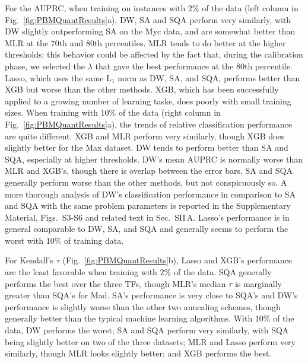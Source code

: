 \documentclass[aps,pra,groupedaddress,nofootinbib,notitlepage,showpacs,floatfix,superscriptaddress]{revtex4-1}
\begin{document}
For the AUPRC, when training on instances with $2\%$ of the data (left column in Fig.~\ref{fig:PBMQuantResults}a), {DW, SA and SQA} perform very similarly, with DW slightly outperforming SA on the Myc data, and are somewhat better than MLR at the $70$th and $80$th percentiles. MLR tends to do better at the higher thresholds: this behavior could be affected by the fact that, during the calibration phase, we selected the $\lambda$ that gave the best performance at the $80$th percentile. {Lasso, which uses the same L$_1$ norm as DW, SA, and SQA, performs better than XGB but worse than the other methods}. XGB, which has been successfully applied to a growing number of learning tasks, does poorly with small training sizes. When training with $10\%$ of the data (right column in Fig.~\ref{fig:PBMQuantResults}a), the trends of relative classification performance are quite different. XGB and MLR perform very similarly, though XGB does slightly better for the Max dataset. {DW tends to perform better than SA and SQA, especially at higher thresholds. DW's mean AUPRC is normally worse than MLR and XGB's, though there is overlap between the error bars.} SA and SQA generally perform worse than the other methods, but not conspicuously so. A more thorough analysis of DW's classification performance in comparison to SA and SQA with the same problem parameters is reported in the Supplementary Material, Figs.~S3-S6 and related text in Sec.~SII\,A. {Lasso's performance is in general comparable to DW, SA, and SQA and generally seems to perform the worst with 10\% of training data.}

{For Kendall's $\tau$ (Fig.~\ref{fig:PBMQuantResults}b), Lasso and XGB's performance are the least favorable when training with $2\%$ of the data. SQA generally performs the best over the three TFs, though MLR's median $\tau$ is marginally greater than SQA's for Mad. SA's performance is very close to SQA's and DW's performance is slightly worse than the other two annealing schemes, though generally better than the typical machine learning algorithms}. With $10\%$ of the data, {DW performs the worst; SA and SQA perform very similarly, with SQA being slightly better on two of the three datasets; MLR and Lasso perform very similarly, though MLR looks slightly better; and XGB performs the best.} 
\end{document}
